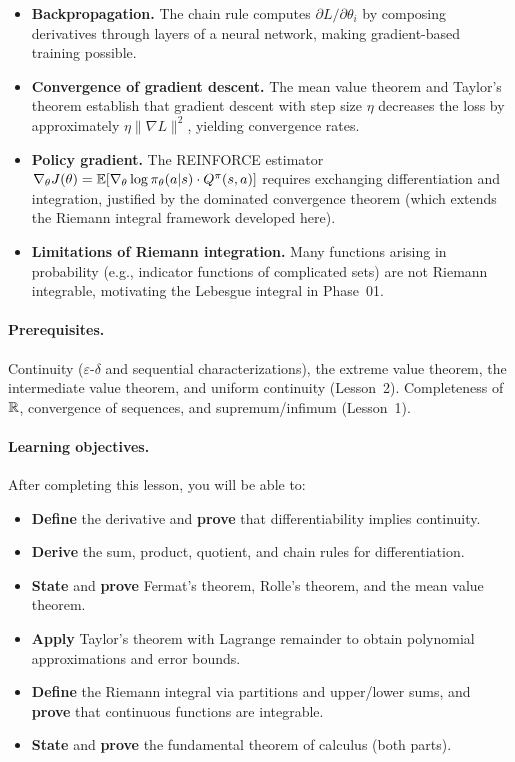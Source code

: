 \documentclass[11pt,a4paper]{article}
\begin{document}
\begin{rlconnection}[title={Why RL/ML needs differentiation and integration}]
\begin{itemize}[nosep]
  \item \textbf{Backpropagation.} The chain rule computes
    $\partial L / \partial \theta_i$ by composing derivatives through
    layers of a neural network, making gradient-based training possible.
  \item \textbf{Convergence of gradient descent.} The mean value theorem
    and Taylor's theorem establish that gradient descent with step size
    $\eta$ decreases the loss by approximately
    $\eta \|\nabla L\|^2$, yielding convergence rates.
  \item \textbf{Policy gradient.} The REINFORCE estimator
    $\nabla_\theta J(\theta) = \mathbb{E}[\nabla_\theta \log \pi_\theta(a|s)
    \cdot Q^\pi(s,a)]$ requires exchanging differentiation and
    integration, justified by the dominated convergence theorem (which
    extends the Riemann integral framework developed here).
  \item \textbf{Limitations of Riemann integration.} Many functions
    arising in probability (e.g., indicator functions of complicated
    sets) are not Riemann integrable, motivating the Lebesgue integral
    in Phase~01.
\end{itemize}
\end{rlconnection}

\paragraph{Prerequisites.}
Continuity ($\varepsilon$-$\delta$ and sequential characterizations), the
extreme value theorem, the intermediate value theorem, and uniform
continuity (Lesson~2). Completeness of $\mathbb{R}$, convergence of sequences,
and supremum/infimum (Lesson~1).

\paragraph{Learning objectives.}
After completing this lesson, you will be able to:
\begin{itemize}[nosep]
  \item \textbf{Define} the derivative and \textbf{prove} that
    differentiability implies continuity.
  \item \textbf{Derive} the sum, product, quotient, and chain rules for
    differentiation.
  \item \textbf{State} and \textbf{prove} Fermat's theorem, Rolle's
    theorem, and the mean value theorem.
  \item \textbf{Apply} Taylor's theorem with Lagrange remainder to obtain
    polynomial approximations and error bounds.
  \item \textbf{Define} the Riemann integral via partitions and upper/lower
    sums, and \textbf{prove} that continuous functions are integrable.
  \item \textbf{State} and \textbf{prove} the fundamental theorem of
    calculus (both parts).
\end{itemize}
\end{document}
